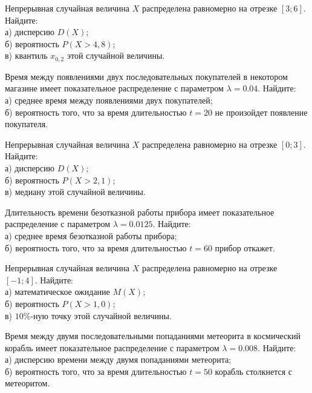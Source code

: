\vfill

\newpage\setcounter{zad}{0}

\z Непрерывная случайная величина $X$ распределена равномерно на отрезке $[3; 6]$. Найдите: \\ \quad а) дисперсию $D(X)$; \\ \quad б) вероятность $P(X>4{,}8)$; \\ \quad в) квантиль $x_{0{,}2}$ этой случайной величины.


\vfill

\z Время между появлениями двух последовательных покупателей в некотором магазине имеет показательное распределение с параметром $\lambda = 0.04$. Найдите: \\ \quad а) среднее время между появлениями двух покупателей; \\ \quad б) вероятность того, что за время длительностью $t = 20$ не произойдет появление покупателя.
 

\vfill

\newpage\setcounter{zad}{0}

\z Непрерывная случайная величина $X$ распределена равномерно на отрезке $[0; 3]$. Найдите: \\ \quad а) дисперсию $D(X)$; \\ \quad б) вероятность $P(X>2{,}1)$; \\ \quad в) медиану этой случайной величины.


\vfill

\z Длительность времени безотказной работы прибора имеет показательное распределение с параметром $\lambda = 0.0125$. Найдите: \\ \quad а) среднее время безотказной работы прибора; \\ \quad б) вероятность того, что за время длительностью $t = 60$ прибор  откажет.
 

\vfill

\newpage\setcounter{zad}{0}

\z Непрерывная случайная величина $X$ распределена равномерно на отрезке $[-1; 4]$. Найдите: \\ \quad а) математическое ожидание $M(X)$; \\ \quad б) вероятность $P(X>1{,}0)$; \\ \quad в) $10\%$-ную точку этой случайной величины.


\vfill

\z Время между двумя последовательными попаданиями метеорита в космический корабль имеет показательное распределение с параметром $\lambda = 0.008$. Найдите: \\ \quad а) дисперсию времени между двумя попаданиями метеорита; \\ \quad б) вероятность того, что за время длительностью $t = 50$ корабль  столкнется с метеоритом.
 


